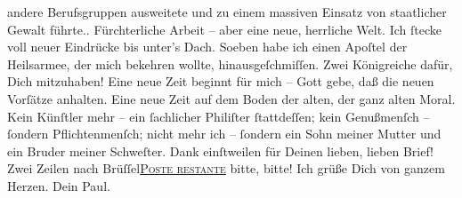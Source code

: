 \begin{ledgroupsized}[t]{13cm}
{{{                  andere Berufsgruppen ausweitete und zu einem massiven Einsatz von staatlicher
                  Gewalt führte.}}}\label{K_L02662-1h}. Fürchterliche Arbeit – aber eine neue, herrliche Welt. Ich
               ſtecke voll neuer Eindrücke bis unter’s Dach. Soeben habe ich einen Apoſtel der Heilsarmee, der mich bekehren wollte,
               hinausgeſchmiſſen. Zwei Königreiche dafür, Dich mitzuhaben! Eine neue Zeit beginnt
               für mich – Gott gebe, daß die neuen Vorſätze anhalten. Eine neue Zeit auf dem Boden
               der alten, der ganz alten Moral. Kein Künſtler mehr – ein ſachlicher Philiſter
               ſtattdeſſen; kein Genußmenſch – ſondern \strikeout{\textcolor{gray}{nur}} Pflichtenmenſch; nicht mehr ich – ſondern ein Sohn meiner Mutter und ein Bruder meiner Schweſter. \label{K_L02662-2v}\label{K_L02662-2h} Dank einſtweilen für Deinen lieben, lieben Brief! Zwei
               Zeilen nach Brüſſel\introOben{}\textsc{\uline{Poste restante}}\introOben{}{ }{\dotstwo} bitte, bitte! Ich grüße Dich von ganzem Herzen. Dein
                  \spacefill\mbox{Paul.}\pend
           \pstart
           \noindent{}\label{T_L02662-1v}\label{T_L02662-1h}\pend
                     \endnumbering{}\end{ledgroupsized}  \newcommand{\dateiname}{L02662}\newcommand{\titel}{Paul Goldmann an Arthur Schnitzler, 11. 5. 1891}\newcommand{\editorInnen}{Martin Anton Müller und Laura Untner}
            \footnotesize
\begin{ledgroupsized}[t]{11.5cm}
\end{ledgroupsized}
         
      
